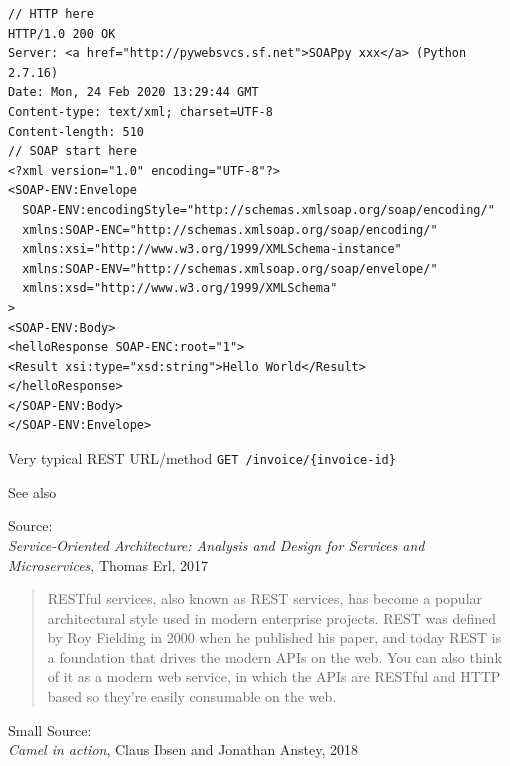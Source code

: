 \documentclass[Screen16to9,17pt]{foils}
\begin{document}

\begin{verbatim}
// HTTP here
HTTP/1.0 200 OK
Server: <a href="http://pywebsvcs.sf.net">SOAPpy xxx</a> (Python 2.7.16)
Date: Mon, 24 Feb 2020 13:29:44 GMT
Content-type: text/xml; charset=UTF-8
Content-length: 510
// SOAP start here
<?xml version="1.0" encoding="UTF-8"?>
<SOAP-ENV:Envelope
  SOAP-ENV:encodingStyle="http://schemas.xmlsoap.org/soap/encoding/"
  xmlns:SOAP-ENC="http://schemas.xmlsoap.org/soap/encoding/"
  xmlns:xsi="http://www.w3.org/1999/XMLSchema-instance"
  xmlns:SOAP-ENV="http://schemas.xmlsoap.org/soap/envelope/"
  xmlns:xsd="http://www.w3.org/1999/XMLSchema"
>
<SOAP-ENV:Body>
<helloResponse SOAP-ENC:root="1">
<Result xsi:type="xsd:string">Hello World</Result>
</helloResponse>
</SOAP-ENV:Body>
</SOAP-ENV:Envelope>
\end{verbatim}





\begin{list2}
\item Very typical REST URL/method \verb+GET /invoice/{invoice-id}+
\item See also 
\end{list2}
Source: {\footnotesize\\
\emph{Service‑Oriented Architecture: Analysis and Design for Services and Microservices}, Thomas Erl, 2017}





\begin{quote}
  RESTful services, also known as REST services, has become a popular architectural style
  used in modern enterprise projects. REST was defined by Roy Fielding in 2000 when
  he published his paper, and today REST is a foundation that drives the modern APIs
  on the web. You can also think of it as a modern web service, in which the APIs are
  RESTful and HTTP based so they’re easily consumable on the web.
\end{quote}
Small
Source: {\footnotesize\\
\emph{Camel in action}, Claus Ibsen and Jonathan Anstey, 2018}

\end{document}
